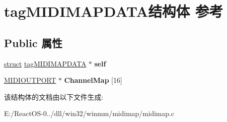 \hypertarget{structtag_m_i_d_i_m_a_p_d_a_t_a}{}\section{tag\+M\+I\+D\+I\+M\+A\+P\+D\+A\+T\+A结构体 参考}
\label{structtag_m_i_d_i_m_a_p_d_a_t_a}
\subsection*{Public 属性}
\begin{DoxyCompactItemize}
\item 
\mbox{\label{structtag_m_i_d_i_m_a_p_d_a_t_a_a07ac510c81cbe57f8ba4e6cd339b5c20}} 
\hyperlink{interfacestruct}{struct} \hyperlink{structtag_m_i_d_i_m_a_p_d_a_t_a}{tag\+M\+I\+D\+I\+M\+A\+P\+D\+A\+TA} $\ast$ {\bfseries self}
\item 
\mbox{\label{structtag_m_i_d_i_m_a_p_d_a_t_a_a90b69e9c0f4658d175a3a8a81d0f3199}} 
\hyperlink{structtag_m_i_d_i_o_u_t_p_o_r_t}{M\+I\+D\+I\+O\+U\+T\+P\+O\+RT} $\ast$ {\bfseries Channel\+Map} \mbox{[}16\mbox{]}
\end{DoxyCompactItemize}


该结构体的文档由以下文件生成\+:\begin{DoxyCompactItemize}
\item 
E\+:/\+React\+O\+S-\/0../dll/win32/winmm/midimap/midimap.\+c\end{DoxyCompactItemize}
